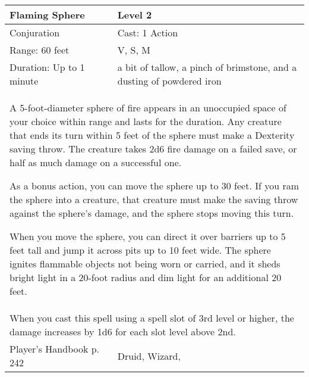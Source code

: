 \documentclass[11pt]{report}
\begin{document}
\begin{table}[H]
	\begin{tabular}{||p{6cm}|p{6cm}||}
		\hline\hline
		\bf{Flaming Sphere} & Level 2\\ \hline
		Conjuration & Cast: 1 Action\\ \hline
		Range: 60 feet & V, S, M\\ \hline
		Duration: Up to 1 minute & a bit of tallow, a pinch of brimstone, and a dusting of powdered iron\\ \hline
		\multicolumn{2}{||p{12cm}||}{A 5-foot-diameter sphere of fire appears in an unoccupied space of your choice within range and lasts for the duration. 
Any creature that ends its turn within 5 feet of the sphere must make a Dexterity saving throw. The creature takes 2d6 fire damage on a failed save, or half as much damage on a successful one.

As a bonus action, you can move the sphere up to 30 feet. If you ram the sphere into a creature, that creature must make the saving throw against the sphere’s damage, and the sphere stops moving this turn.

When you move the sphere, you can direct it over barriers up to 5 feet tall and jump it across pits up to 10 feet wide. The sphere ignites flammable objects not being worn or carried, and it sheds bright light in a 20-foot radius and dim light for an additional 20 feet.}\\ \hline
		\multicolumn{2}{||p{12cm}||}{When you cast this spell using a spell slot of 3rd level or higher, the damage increases by 1d6 for each slot level above 2nd.}\\ \hline
Player's Handbook p. 242 & Druid, Wizard, \\ \hline\hline
	\end{tabular}
\end{table}
\end{document}
